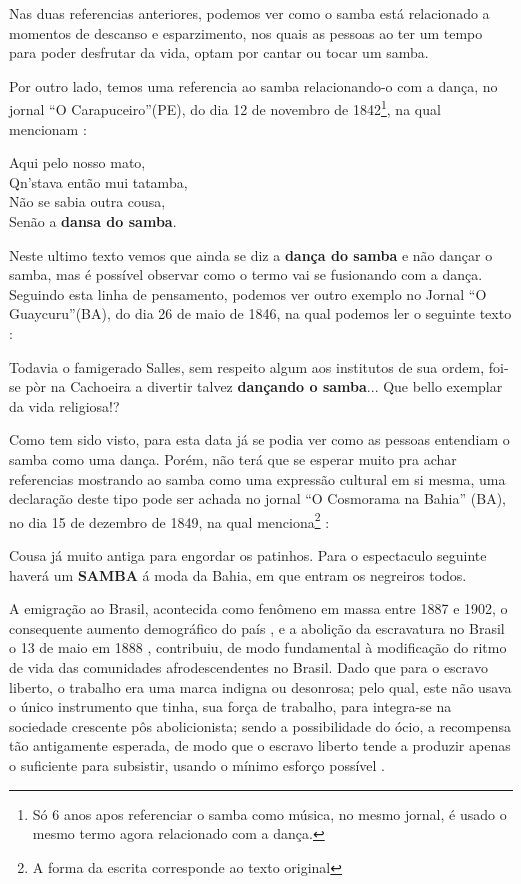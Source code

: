 Nas duas referencias anteriores, 
podemos ver como o samba está relacionado a momentos de descanso e esparzimento, 
nos quais as pessoas ao ter um tempo para poder desfrutar da vida,
optam por cantar ou tocar um samba.

Por outro lado, temos uma referencia ao samba relacionando-o com a dança, no jornal ``O Carapuceiro''(PE),
do dia 12 de novembro de 1842\footnote{Só 6 anos apos referenciar o samba como música, 
no mesmo jornal, é usado o mesmo termo agora relacionado com a dança.}, 
na qual mencionam \cite[pp. 5]{sambaperiodicoocapuceiro2}:
\begin{citando}%
Aqui pelo nosso mato,\\
Qn'stava então mui tatamba,\\
Não se sabia outra cousa,\\
Senão a \textbf{dansa do samba}.
\end{citando}
Neste ultimo texto vemos que ainda se diz a \textbf{dança do samba} e não dançar o samba,
mas é possível observar como o termo vai se fusionando com a dança.
Seguindo esta linha de pensamento, 
podemos ver outro exemplo no Jornal ``O Guaycuru''(BA), do dia 26 de maio de 1846,
na qual podemos ler o seguinte texto \cite[pp. 2]{sambaperiodicooguaycuru}:
\begin{citando}%
Todavia o famigerado Salles, sem respeito algum aos institutos de sua ordem, 
foi-se pòr na Cachoeira a divertir talvez \textbf{dançando o samba}...
Que bello exemplar da vida religiosa!?
\end{citando}
Como tem sido visto, 
para esta data já se podia ver como as pessoas entendiam o samba como uma dança.
Porém, não terá que se esperar muito pra achar referencias mostrando ao samba
como uma expressão cultural em si mesma, 
uma declaração deste tipo pode ser achada no jornal ``O Cosmorama na Bahia'' (BA), 
no dia 15 de dezembro de 1849, na qual menciona\footnote{\label{footort3}A forma da escrita corresponde ao texto original} \cite[pp. 2]{sambaperiodicoocosmorama}:
\begin{citando}%
Cousa já muito antiga para engordar os patinhos. 
Para o espectaculo seguinte haverá um \textbf{SAMBA} á moda da Bahia, 
em que entram os negreiros todos.
\end{citando}



A emigração ao Brasil, acontecida como fenômeno em massa   entre 1887 e 1902,
o consequente aumento demográfico do país \cite[pp. 18]{trento1989outro}, e 
a abolição da escravatura no Brasil o 13 de maio em 1888 \cite[pp. 117]{dorigny2019abolicoes},
contribuiu, de modo fundamental à modificação do ritmo de vida das comunidades
afrodescendentes no Brasil.
Dado que para o escravo liberto, o trabalho era uma marca indigna ou desonrosa;
pelo qual, este não usava  o único instrumento que tinha, sua força de trabalho, 
para  integra-se na sociedade crescente pôs abolicionista; 
sendo a possibilidade do ócio, a recompensa tão antigamente esperada, 
de modo que o escravo liberto tende a produzir apenas o suficiente para subsistir,
usando o mínimo esforço possível \cite[pp. 28]{durham1966assimilacao} \cite[pp. 25]{trento1989outro}.

